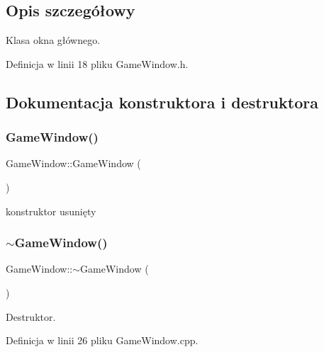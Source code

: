 \subsection{Opis szczegółowy}
Klasa okna głównego. 

Definicja w linii 18 pliku Game\+Window.\+h.



\subsection{Dokumentacja konstruktora i destruktora}
\mbox{\label{class_game_window_aeb8fe4d63cdd9e9d3e6fdcb35d15a37c}} 
\subsubsection{\texorpdfstring{Game\+Window()}{GameWindow()}\hspace{0.1cm}{\footnotesize\ttfamily [1/2]}}
{\footnotesize\ttfamily Game\+Window\+::\+Game\+Window (\begin{DoxyParamCaption}{ }\end{DoxyParamCaption})\hspace{0.3cm}{\ttfamily [delete]}}



konstruktor usunięty 

\mbox{\label{class_game_window_a55b071c0390e45c064a160c1e6baaa08}} 
\subsubsection{\texorpdfstring{$\sim$\+Game\+Window()}{~GameWindow()}}
{\footnotesize\ttfamily Game\+Window\+::$\sim$\+Game\+Window (\begin{DoxyParamCaption}{ }\end{DoxyParamCaption})}



Destruktor. 



Definicja w linii 26 pliku Game\+Window.\+cpp.

\mbox{\label{class_game_window_a22da49d930c2fd26888b223049a9da18}} 
